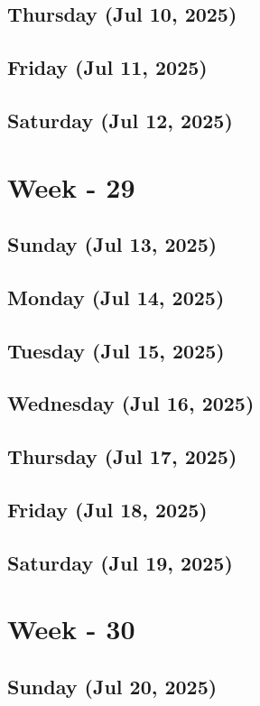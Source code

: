 \subsection*{Thursday (Jul 10, 2025)}
\subsection*{Friday (Jul 11, 2025)}
\subsection*{Saturday (Jul 12, 2025)}

\section{Week - 29}
\subsection*{Sunday (Jul 13, 2025)}
\subsection*{Monday (Jul 14, 2025)}
\subsection*{Tuesday (Jul 15, 2025)}
\subsection*{Wednesday (Jul 16, 2025)}
\subsection*{Thursday (Jul 17, 2025)}
\subsection*{Friday (Jul 18, 2025)}
\subsection*{Saturday (Jul 19, 2025)}

\section{Week - 30}
\subsection*{Sunday (Jul 20, 2025)}
